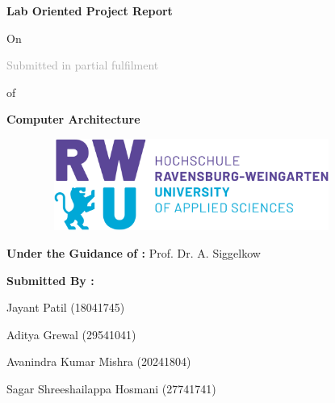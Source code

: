 \documentclass[12pt]{report}
\begin{document}
\begin{titlepage}
\begin{center}
    \hspace{5mm}\textbf{\LARGE Lab Oriented Project Report }
    \begin{center}
    \vspace{0.5mm}
    \Large On
    \end{center}
    \vspace{0.5mm}
\end{center}

\vspace{5mm}
\begin{center}
\textcolor{darkgray}{\LARGE Submitted in partial fulfilment }
\end{center}
\begin{center}
\vspace{0.5mm}
\Large of
\vspace{0.5mm}
\end{center}
\begin{center}
\textbf{\LARGE Computer Architecture}
\end{center}

\vspace{5mm}

\begin{figure}[h!]
    \begin{center}
    \includegraphics[width=10cm, height=3cm]{Image/logoR.png}
    \end{center}
    \end{figure}
    
\vspace{2mm} 
\begin{center}
\textbf{\Large Under the Guidance of :}
\newline
\Large Prof. Dr. A. Siggelkow 
\end{center}

\vspace{5mm}

\textbf{\hspace{70mm} \Large Submitted By :}

\hspace{63mm} \Large Jayant Patil (18041745)
\par
\hspace{60mm} \Large Aditya Grewal (29541041)
\par
\hspace{57mm} \Large Avanindra Kumar Mishra (20241804) 
\par 
\hspace{47mm} \Large Sagar Shreeshailappa Hosmani (27741741)


\end{titlepage}
\end{document}
